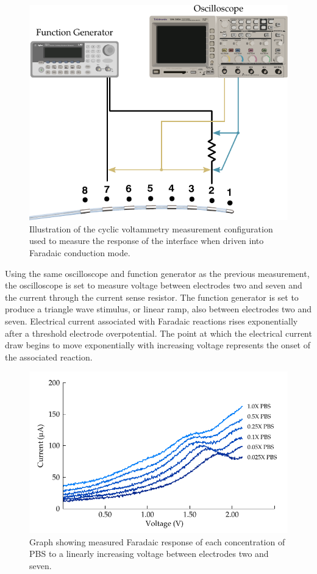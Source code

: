       \begin{figure}
        \centering
        \includegraphics{content/pt2/08-InterfaceParameters/graphics/measurement_Faradaic_setup_initial}
        \caption{\label{fig:pt2-measurement_Faradaic_setup_initial}Illustration of the cyclic voltammetry measurement configuration used to measure the response of the interface when driven into Faradaic conduction mode.}
      \end{figure}
      Using the same oscilloscope and function generator as the previous measurement, the oscilloscope is set to measure voltage between electrodes two and seven and the current through the current sense resistor.
      The function generator is set to produce a triangle wave stimulus, or linear ramp, also between electrodes two and seven.
      Electrical current associated with Faradaic reactions rises exponentially after a threshold electrode overpotential.
      The point at which the electrical current draw begins to move exponentially with increasing voltage represents the onset of the associated reaction.
      \begin{figure}
        \centering
        \includegraphics{content/pt2/08-InterfaceParameters/graphics/faradaicOnset-all-average}
        \caption{\label{fig:pt2-faradaic_measurement}Graph showing measured Faradaic response of each concentration of PBS to a linearly increasing voltage between electrodes two and seven.}
      \end{figure}

